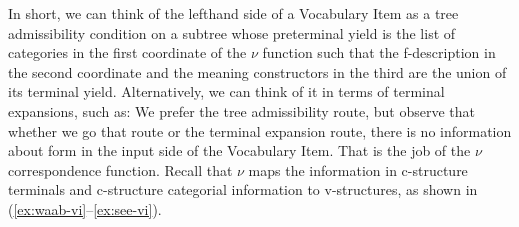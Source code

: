 \documentclass[output=paper,hidelinks]{langscibook}
\begin{document}
In short, we can think of the lefthand side of a Vocabulary Item as a
tree admissibility condition \citep{mcca:68} on a subtree whose 
preterminal yield is the list of categories in the first coordinate of
the $\nu$ function such that the f-description in the second
coordinate and the meaning constructors in the third are the union of
its terminal yield. Alternatively, we can think of it in terms of
terminal expansions, such as:
%
  \largerpage
  We prefer the tree admissibility route, but observe that whether we
  go that route or the terminal expansion route, there is no
  information about form in the input side of the Vocabulary
  Item. That is the job of the $\nu$ correspondence function. Recall
  that $\nu$ maps the information in c-structure terminals and
  c-structure categorial information to v-structures, as shown in
  (\ref{ex:waab-vi}--\ref{ex:see-vi}).
\end{document}

